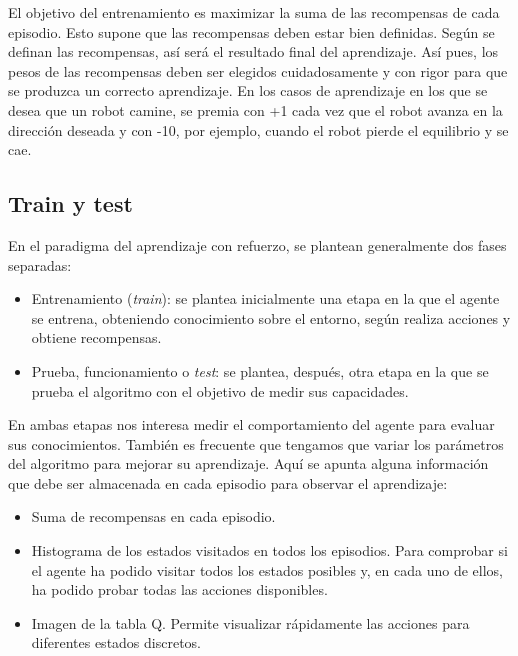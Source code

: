 \documentclass{article}
\begin{document}
El objetivo del entrenamiento es maximizar la suma de las recompensas de cada episodio. Esto supone que las recompensas deben estar bien definidas. Según se definan las recompensas, así será el resultado final del aprendizaje.  Así pues, los pesos de las recompensas deben ser elegidos cuidadosamente y con rigor para que se produzca un correcto aprendizaje. En los casos de aprendizaje en los que se desea que un robot camine, se premia con +1 cada vez que el robot avanza en la dirección deseada y con -10, por ejemplo, cuando el robot pierde el equilibrio y se cae.



\subsection{Train y test}
En el paradigma del aprendizaje con refuerzo, se plantean generalmente dos fases separadas: 
\begin{itemize}
    \item Entrenamiento (\textit{train}): se plantea inicialmente una etapa en la que el agente se entrena, obteniendo conocimiento sobre el entorno, según realiza acciones y obtiene recompensas.
    
\item Prueba, funcionamiento o \textit{test}: se plantea, después, otra etapa en la que se prueba el algoritmo con el objetivo de medir sus capacidades.
\end{itemize}

 En ambas etapas nos interesa medir el comportamiento del agente para evaluar sus conocimientos. También es frecuente que tengamos que variar los parámetros del algoritmo para mejorar su aprendizaje. Aquí se apunta alguna información que debe ser almacenada en cada episodio para observar el aprendizaje:
 \begin{itemize}
     \item Suma de recompensas en cada episodio.
     \item Histograma de los estados visitados en todos los episodios. Para comprobar si el agente ha podido visitar todos los estados posibles y, en cada uno de ellos, ha podido probar todas las acciones disponibles.

     \item Imagen de la tabla Q. Permite visualizar rápidamente las acciones para diferentes estados discretos.
 \end{itemize}
\end{document}

